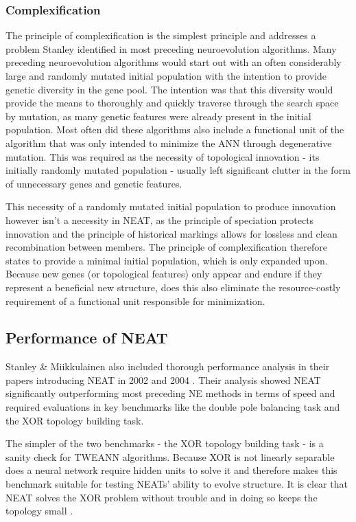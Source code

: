 \documentclass[journal, a4paper]{IEEEtran}
\begin{document}
\subsubsection{\textbf{Complexification}}
The principle of complexification is the simplest principle and addresses a problem Stanley identified in most preceding neuroevolution algorithms. Many preceding neuroevolution algorithms would start out with an often considerably large and randomly mutated initial population with the intention to provide genetic diversity in the gene pool. The intention was that this diversity would provide the means to thoroughly and quickly traverse through the search space by mutation, as many genetic features were already present in the initial population. Most often did these algorithms also include a functional unit of the algorithm that was only intended to minimize the ANN through degenerative mutation. This was required as the necessity of topological innovation - its initially randomly mutated population - usually left significant clutter in the form of unnecessary genes and genetic features.

This necessity of a randomly mutated initial population to produce innovation however isn't a necessity in NEAT, as the principle of speciation protects innovation and the principle of historical markings allows for lossless and clean recombination between members. The principle of complexification therefore states to provide a minimal initial population, which is only expanded upon. Because new genes (or topological features) only appear and endure if they represent a beneficial new structure, does this also eliminate the resource-costly requirement of a functional unit responsible for minimization.



\subsection{Performance of NEAT} \label{sec:neat_performance}

Stanley \& Miikkulainen also included thorough performance analysis in their papers introducing NEAT in 2002 and 2004 \cite{sta02_1, sta02_2, sta04}. Their analysis showed NEAT significantly outperforming most preceding NE methods in terms of speed and required evaluations in key benchmarks like the double pole balancing task \cite{and89} and the XOR topology building task.

The simpler of the two benchmarks - the XOR topology building task - is a sanity check for TWEANN algorithms. Because XOR is not linearly separable does a neural network require hidden units to solve it and therefore makes this benchmark suitable for testing NEATs' ability to evolve structure. It is clear that NEAT solves the XOR problem without trouble and in doing so keeps the topology small \cite[chap 4.1]{sta04}. 
\end{document}
